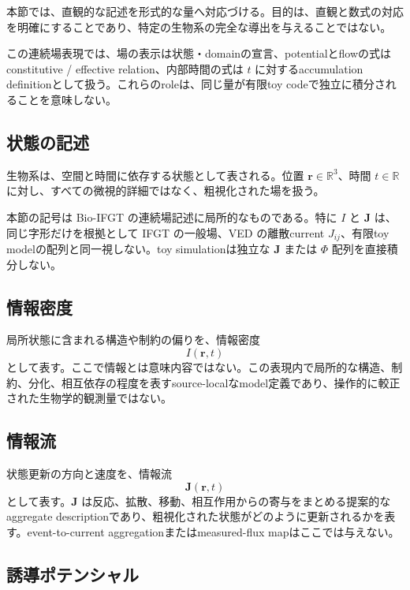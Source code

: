 \documentclass[11pt]{ltjsarticle}
\newcommand{\I}{I}
\newcommand{\J}{\mathbf{J}}
\newcommand{\PhiI}{\Phi}
\begin{document}
本節では、直観的な記述を形式的な量へ対応づける。目的は、直観と数式の対応を明確にすることであり、特定の生物系の完全な導出を与えることではない。

この連続場表現では、場の表示は状態・domainの宣言、potentialとflowの式はconstitutive / effective relation、内部時間の式は \(t\) に対するaccumulation definitionとして扱う。これらのroleは、同じ量が有限toy codeで独立に積分されることを意味しない。

\subsection{状態の記述}

生物系は、空間と時間に依存する状態として表される。位置 \(\mathbf{r}\in\mathbb{R}^3\)、時間 \(t\in\mathbb{R}\) に対し、すべての微視的詳細ではなく、粗視化された場を扱う。

本節の記号は Bio-IFGT の連続場記述に局所的なものである。特に \(\I\) と \(\J\) は、同じ字形だけを根拠として IFGT の一般場、VED の離散current \(J_{ij}\)、有限toy modelの配列と同一視しない。toy simulationは独立な \(\J\) または \(\PhiI\) 配列を直接積分しない。

\subsection{情報密度}

局所状態に含まれる構造や制約の偏りを、情報密度
\begin{equation}
  \I(\mathbf{r},t)
\end{equation}
として表す。ここで情報とは意味内容ではない。この表現内で局所的な構造、制約、分化、相互依存の程度を表すsource-localなmodel定義であり、操作的に較正された生物学的観測量ではない。

\subsection{情報流}

状態更新の方向と速度を、情報流
\begin{equation}
  \J(\mathbf{r},t)
\end{equation}
として表す。\(\J\) は反応、拡散、移動、相互作用からの寄与をまとめる提案的なaggregate descriptionであり、粗視化された状態がどのように更新されるかを表す。event-to-current aggregationまたはmeasured-flux mapはここでは与えない。

\subsection{誘導ポテンシャル}
\end{document}
